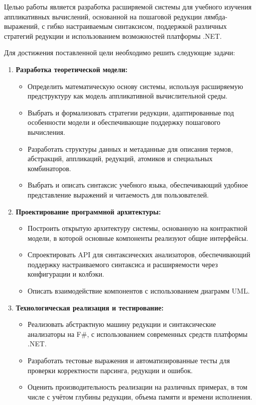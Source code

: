 Целью работы является разработка расширяемой системы для учебного изучения аппликативных вычислений, основанной на пошаговой редукции лямбда-выражений, с гибко настраиваемым синтаксисом, поддержкой различных стратегий редукции и использованием возможностей платформы .NET.

Для достижения поставленной цели необходимо решить следующие задачи:

\begin{enumerate}
  \item \textbf{Разработка теоретической модели:}
  \begin{itemize}
    \item Определить математическую основу системы, используя расширяемую предструктуру как модель аппликативной вычислительной среды.
    \item Выбрать и формализовать стратегии редукции, адаптированные под особенности модели и обеспечивающие поддержку пошагового вычисления.
    \item Разработать структуры данных и метаданные для описания термов, абстракций, аппликаций, редукций, атомиков и специальных комбинаторов.
    \item Выбрать и описать синтаксис учебного языка, обеспечивающий удобное представление выражений и читаемость для пользователей.
  \end{itemize}

  \item \textbf{Проектирование программной архитектуры:}
  \begin{itemize}
    \item Построить открытую архитектуру системы, основанную на контрактной модели, в которой основные компоненты реализуют общие интерфейсы.
    \item Спроектировать API для синтаксических анализаторов, обеспечивающий поддержку настраиваемого синтаксиса и расширяемости через конфигурации и колбэки.
    \item Описать взаимодействие компонентов с использованием диаграмм UML.
  \end{itemize}

  \item \textbf{Технологическая реализация и тестирование:}
  \begin{itemize}
    \item Реализовать абстрактную машину редукции и синтаксические анализаторы на F\#, с использованием современных средств платформы .NET.
    \item Разработать тестовые выражения и автоматизированные тесты для проверки корректности парсинга, редукции и ошибок.
    \item Оценить производительность реализации на различных примерах, в том числе с учётом глубины редукции, объема памяти и времени исполнения.
  \end{itemize}
\end{enumerate}

